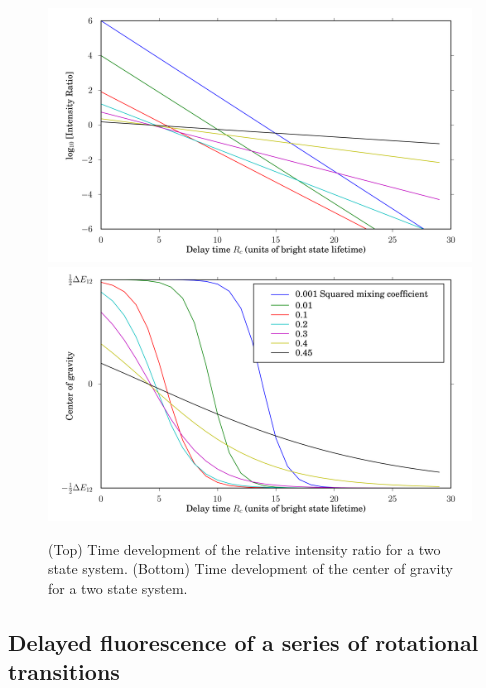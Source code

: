 \documentclass[12pt,draft]{mitthesis}
\begin{document}
\begin{figure}
  \caption{(Top) Time development of the relative intensity ratio for
    a two state system. (Bottom) Time development of the center of
    gravity for a two state system.}
  \label{fig:cog-devel}
  \centering
  \includegraphics[width=6in]{ratio-development.png}
  \includegraphics[width=6in]{cog-development.png}
\end{figure}

\subsection{Delayed fluorescence of a series of rotational
  transitions}
\end{document}
